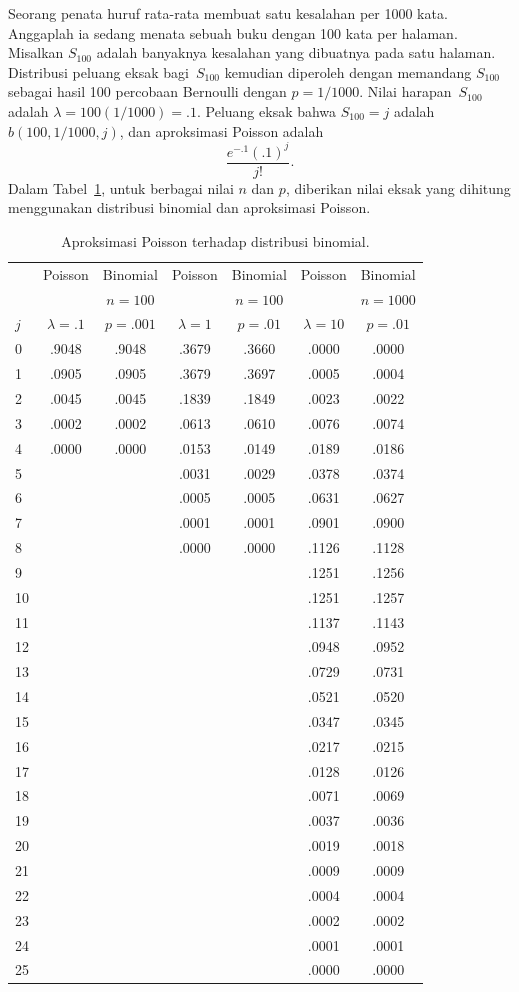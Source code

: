 \begin{example}\label{exam 5.3} Seorang penata huruf rata-rata membuat
satu kesalahan per 1000 kata. Anggaplah ia sedang menata sebuah buku dengan 100 kata per
halaman. Misalkan $S_{100}$ adalah banyaknya kesalahan yang dibuatnya pada satu halaman.
Distribusi peluang eksak bagi~$S_{100}$ kemudian diperoleh dengan memandang $S_{100}$
sebagai hasil 100 percobaan Bernoulli dengan $p = 1/1000$. Nilai harapan~$S_{100}$ adalah
$\lambda = 100(1/1000) = .1$. Peluang eksak bahwa $S_{100} = j$ adalah
$b(100,1/1000,j)$, dan aproksimasi Poisson adalah
$$
\frac {e^{-.1}(.1)^j}{j!}.
$$ Dalam Tabel~\ref{table 5.1}, untuk berbagai nilai $n$ dan $p$, diberikan nilai eksak
yang dihitung menggunakan distribusi binomial dan aproksimasi Poisson.
\begin{table}
\centering
\begin{tabular}{|l|c|c|c|c|c|c|}
\hline
&Poisson&Binomial&Poisson&Binomial&Poisson&Binomial \\
&&$n = 100$&&$n = 100$&&$n = 1000$\\
$j$&$\lambda = .1$&$p = .001$&$\lambda = 1$&$p = .01$&$\lambda = 10$&$p = .01$\\
\hline
0&.9048&.9048&.3679&.3660&.0000&.0000\\
1&.0905&.0905&.3679&.3697&.0005&.0004\\
2&.0045&.0045&.1839&.1849&.0023&.0022\\
3&.0002&.0002&.0613&.0610&.0076&.0074\\
4&.0000&.0000&.0153&.0149&.0189&.0186\\
5&&&.0031&.0029&.0378&.0374\\
6&&&.0005&.0005&.0631&.0627\\
7&&&.0001&.0001&.0901&.0900\\
8&&&.0000&.0000&.1126&.1128\\
9&&&&&.1251&.1256\\
10&&&&&.1251&.1257\\
11&&&&&.1137&.1143\\
12&&&&&.0948&.0952\\
13&&&&&.0729&.0731\\
14&&&&&.0521&.0520\\
15&&&&&.0347&.0345\\
16&&&&&.0217&.0215\\
17&&&&&.0128&.0126\\
18&&&&&.0071&.0069\\
19&&&&&.0037&.0036\\
20&&&&&.0019&.0018\\
21&&&&&.0009&.0009\\
22&&&&&.0004&.0004\\
23&&&&&.0002&.0002\\
24&&&&&.0001&.0001\\
25&&&&&.0000&.0000\\
\hline
\end{tabular}
\caption{Aproksimasi Poisson terhadap distribusi binomial.}
\label{table 5.1}
\end{table}
\end{example}


